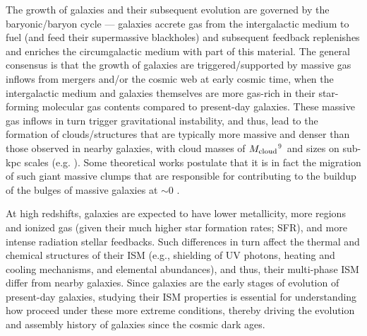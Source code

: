 \documentclass[apj]{emulateapj} %
\begin{document}
The growth of galaxies and their subsequent evolution are governed by the baryonic/baryon cycle ---
galaxies accrete gas from the intergalactic medium to fuel \SF (and feed their supermassive blackholes)
and subsequent feedback replenishes and enriches the circumgalactic medium with part of this material.
The general consensus is that the growth of \highz galaxies are triggered/supported by massive
gas inflows from mergers and/or the cosmic web at early cosmic time, when the intergalactic 
medium and galaxies themselves are more gas-rich in their star-forming molecular 
gas contents compared to present-day galaxies.
These massive gas inflows in turn trigger gravitational instability, and thus, lead
to the formation of clouds/structures that are typically more massive and denser than those 
observed in nearby galaxies, with cloud masses of $M_{\rm cloud}$$^9$\,\Msun 
and sizes on sub-kpc scales (e.g. \citealt{Gabor13a, Hopkins14a, Inoue16a}).
Some theoretical works postulate that it is in fact the
migration of such giant massive clumps that are responsible for contributing to the 
buildup of the bulges of massive galaxies at \z$\sim$0 \citep[e.g.,][]{Ceverino10a}.


At high redshifts, galaxies are expected to have lower metallicity, 
more  regions and ionized gas 
(given their much higher star formation rates; SFR), and 
more intense radiation stellar feedbacks.
Such differences in turn affect the thermal and chemical structures of their ISM (e.g., shielding of UV photons, heating and cooling mechanisms, and elemental abundances),
and thus, their multi-phase ISM differ from nearby galaxies.
Since \highz galaxies are the early stages of evolution of present-day galaxies, 
studying their ISM properties is essential for understanding how \SF proceed under these more extreme
conditions, thereby driving the evolution and assembly history 
of galaxies since the cosmic dark ages.
\end{document}

